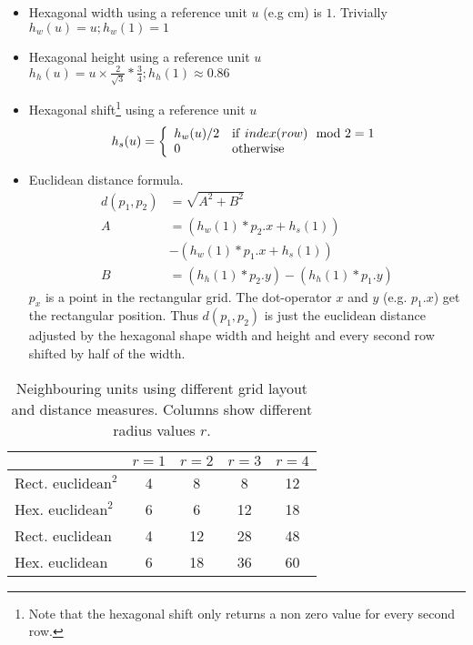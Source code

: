\documentclass{acm_proc_article-sp}
\begin{document}
\begin{itemize}
    \item Hexagonal width using a reference unit $u$ (e.g cm) is $1$. Trivially
        $ h_w(u) = u; h_w(1) = 1 $
    \item Hexagonal height using a reference unit $u$ \\
        $ h_h(u) = u \times \frac{2}{\sqrt{3}} * \frac{3}{4}; h_h(1) \approx 0.86 $
    \item Hexagonal shift\footnote{Note that the hexagonal shift only returns a non zero
    	value for every second row.} using a reference unit $u$ \\
        \[ h_s(u) = \left\{
               \begin{array} {l l}
                   h_w(u)/2 & \mathrm{if}\ index(row)\mod 2 = 1 \\
                   0 & \mathrm{otherwise}
               \end{array}
               \right.\]

    \item Euclidean distance formula.
    \begin{align*}
        d(p_1,p_2) & = \sqrt{ A^2 + B^2 }\\
        A & = (h_w(1) * p_2.x + h_s(1)) \\
          &- (h_w(1) * p_1.x + h_s(1))\\
        B & = (h_h(1) * p_2.y) - (h_h(1) * p_1.y)
    \end{align*}
    $p_x$ is a point in the rectangular grid. The dot-operator $x$ and $y$
    (e.g. $p_1.x$) get the rectangular position. Thus $d(p_1,p_2)$ is just the
    euclidean distance adjusted by the hexagonal shape width and height
    and every second row shifted by half of the width.
\end{itemize}

\begin{table}
	\centering
	\begin{tabular}{|l|c|c|c|c|}
		\hline
		  & $r=1$& $r=2$ & $r=3$ & $r=4$ \\
		\hline
		Rect. $\mathrm{euclidean}^2$ & 4 & 8 & 8 & 12 \\
		\hline
		Hex. $\mathrm{euclidean}^2$ & 6 & 6 & 12 & 18 \\
		\hline
		\hline
		Rect. $\mathrm{euclidean}$ & 4 & 12 &  28 & 48 \\
		\hline
		Hex. $\mathrm{euclidean}$ & 6 & 18 & 36 & 60 \\
		\hline
	\end{tabular}
	\caption{Neighbouring units using different grid layout and distance measures. Columns show different radius values $r$.}
	\label{tab:neighbours}
\end{table}
\end{document}

